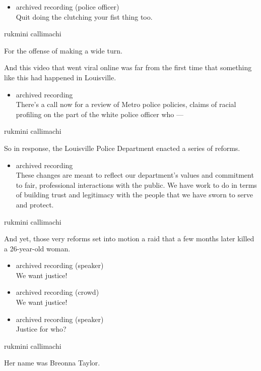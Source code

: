 \begin{itemize}
\tightlist
\item
  archived recording (police officer)\\
  Quit doing the clutching your fist thing too.
\end{itemize}

rukmini callimachi

For the offense of making a wide turn.

And this video that went viral online was far from the first time that
something like this had happened in Louisville.

\begin{itemize}
\tightlist
\item
  archived recording\\
  There's a call now for a review of Metro police policies, claims of
  racial profiling on the part of the white police officer who ---
\end{itemize}

rukmini callimachi

So in response, the Louisville Police Department enacted a series of
reforms.

\begin{itemize}
\tightlist
\item
  archived recording\\
  These changes are meant to reflect our department's values and
  commitment to fair, professional interactions with the public. We have
  work to do in terms of building trust and legitimacy with the people
  that we have sworn to serve and protect.
\end{itemize}

rukmini callimachi

And yet, those very reforms set into motion a raid that a few months
later killed a 26-year-old woman.

\begin{itemize}
\item
  archived recording (speaker)\\
  We want justice!
\item
  archived recording (crowd)\\
  We want justice!
\item
  archived recording (speaker)\\
  Justice for who?
\end{itemize}

rukmini callimachi

Her name was Breonna Taylor.


